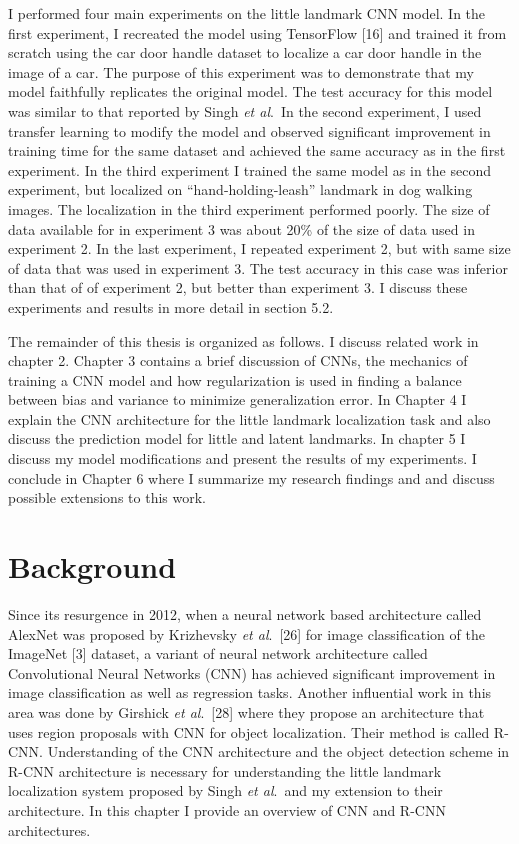 \documentclass [11pt,letterpaper ,twoside ,openany ]{report}
\begin{document}
    I performed four main experiments on the little landmark CNN model. In the first experiment, I recreated the model using TensorFlow [16] and trained it from scratch using the car door handle dataset to localize a car door handle in the image of a car. The purpose of this experiment was to demonstrate that my model faithfully replicates the original model. The test accuracy for this model was similar to that reported by Singh \textit{et al}.\ In the second experiment, I used transfer learning to modify the model and observed significant improvement in training time for the same dataset and achieved the same accuracy as in the first experiment. In the third experiment I trained the same model as in the second experiment, but localized on ``hand-holding-leash'' landmark in dog walking images. The localization in the third experiment performed poorly. The size of data available for in experiment 3 was about 20\% of the size of data used in experiment 2. In the last experiment, I repeated experiment 2, but with same size of data that was used in experiment 3. The test accuracy in this case was inferior than that of of experiment 2, but better than experiment 3. I discuss these experiments and results in more detail in section 5.2.

    The remainder of this thesis is organized as follows. I discuss related work in chapter 2. Chapter 3 contains a brief discussion of CNNs, the mechanics of training a CNN model and how regularization is used in finding a balance between bias and variance to minimize generalization error. In Chapter 4 I explain the CNN architecture for the little landmark localization task and also discuss the prediction model for little and latent landmarks. In chapter 5 I discuss my model modifications and present the results of my experiments. I conclude in Chapter 6 where I summarize my research findings and and discuss possible extensions to this work.

    \chapter{Background}
    \doublespacing
    Since its resurgence in 2012, when a neural network based architecture called AlexNet was proposed by Krizhevsky \textit{et al}.\ [26] for image classification of the ImageNet [3] dataset, a variant of neural network architecture called Convolutional Neural Networks (CNN) has achieved significant improvement in image classification as well as regression tasks. Another influential work in this area was done by Girshick \textit{et al}.\ [28] where they propose an architecture that uses region proposals with CNN for object localization. Their method is called R-CNN. Understanding of the CNN architecture and the object detection scheme in R-CNN architecture is necessary for understanding the little landmark localization system proposed by Singh \textit{et al}.\ and my extension to their architecture. In this chapter I provide an overview of CNN and R-CNN architectures. 
\end{document}
